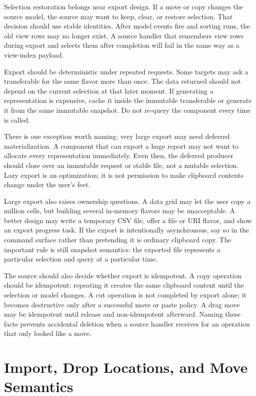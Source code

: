 Selection restoration belongs near export design. If a move or copy changes the source model, the source may want to keep, clear, or restore selection. That decision should use stable identities. After model events fire and sorting runs, the old view rows may no longer exist. A source handler that remembers view rows during export and selects them after completion will fail in the same way as a view-index payload.

Export should be deterministic under repeated requests. Some targets may ask a transferable for the same flavor more than once. The data returned should not depend on the current selection at that later moment. If generating a representation is expensive, cache it inside the immutable transferable or generate it from the same immutable snapshot. Do not re-query the component every time  is called.

There is one exception worth naming: very large export may need deferred materialization. A component that can export a huge report may not want to allocate every representation immediately. Even then, the deferred producer should close over an immutable request or stable file, not a mutable selection. Lazy export is an optimization; it is not permission to make clipboard contents change under the user's feet.

Large export also raises ownership questions. A data grid may let the user copy a million cells, but building several in-memory flavors may be unacceptable. A better design may write a temporary CSV file, offer a file or URI flavor, and show an export progress task. If the export is intentionally asynchronous, say so in the command surface rather than pretending it is ordinary clipboard copy. The important rule is still snapshot semantics: the exported file represents a particular selection and query at a particular time.

The source should also decide whether export is idempotent. A copy operation should be idempotent: repeating it creates the same clipboard content until the selection or model changes. A cut operation is not completed by export alone; it becomes destructive only after a successful move or paste policy. A drag move may be idempotent until release and non-idempotent afterward. Naming these facts prevents accidental deletion when a source handler receives  for an operation that only looked like a move.

\section{Import, Drop Locations, and Move Semantics}

